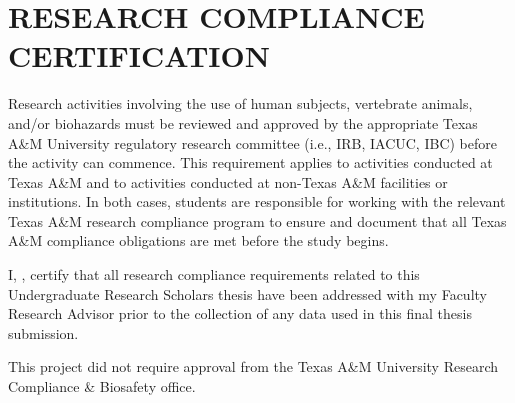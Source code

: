 %



\chapter*{\large\bf RESEARCH COMPLIANCE CERTIFICATION}


\indent\indent Research activities involving the use of human subjects, vertebrate animals, and/or biohazards must be reviewed and approved by the appropriate Texas A\&M  University regulatory research committee (i.e., IRB, IACUC, IBC) before the activity can commence. This requirement applies to activities conducted at Texas A\&M and to activities conducted at non-Texas A\&M facilities or institutions. In both cases, students are responsible for working with the relevant Texas A\&M research compliance program to ensure and document that all Texas A\&M compliance obligations are met before the study begins. %


\indent\indent I, \tamufullname, certify that all research compliance requirements related to this Undergraduate Research Scholars thesis have been addressed with my Faculty Research Advisor prior to the collection of any data used in this final thesis submission.  


\indent\indent This project did not require approval from the Texas A\&M University Research Compliance \& Biosafety office. 
\\



\thispagestyle{empty}

